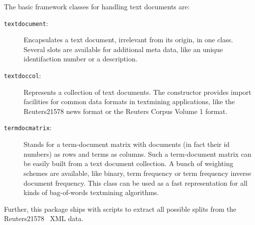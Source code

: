 \documentclass[a4paper]{article}
\begin{document}
The basic framework classes for handling text documents are:
\begin{description}
  \item[\texttt{textdocument}:]
    Encapsulates a text document, irrelevant from its origin, in one
    class. Several slots are available for additional meta data, like
    an unique identifaction number or a description.
  \item[\texttt{textdoccol}:]
    Represents a collection of text documents. The constructor
    provides import facilities for common data formats in textmining
    applications, like the \textsf{Reuters21578} news format or the
    \textsf{Reuters Corpus Volume 1} format.
  \item[\texttt{termdocmatrix}:]
    Stands for a term-document matrix with documents (in fact their id
    numbers) as rows and terms as columns. Such a term-document matrix
    can be easily built from a text document collection. A bunch of
    weighting schemes are available, like binary, term frequency or
    term frequency inverse document frequency. This class can be used
    as a fast representation for all kinds of bag-of-words textmining
    algorithms.
\end{description}

Further, this package ships with scripts to extract all possible
splits from the \textsf{Reuters21578}~\citep{lewis97} XML data.

\end{document}
